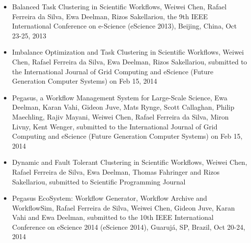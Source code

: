 \begin{itemize}
\item Balanced Task Clustering in Scientific Workflows, Weiwei Chen, Rafael Ferreira da Silva, Ewa Deelman, Rizos Sakellariou, the 9th IEEE International Conference on e-Science (eScience 2013), Beijing, China, Oct 23-25, 2013
\item Imbalance Optimization and Task Clustering in Scientific Workflows, Weiwei Chen, Rafael Ferreira da Silva, Ewa Deelman, Rizos Sakellariou, submitted to the International Journal of Grid Computing and eScience (Future Generation Computer Systems) on Feb 15, 2014
\item Pegasus, a Workflow Management System for Large-Scale Science, Ewa Deelman, Karan Vahi, Gideon Juve, Mats Rynge, Scott Callaghan, Philip Maechling, Rajiv Mayani, Weiwei Chen, Rafael Ferreira da Silva, Miron Livny, Kent Wenger, submitted to the International Journal of Grid Computing and eScience (Future Generation Computer Systems) on Feb 15, 2014
\item Dynamic and Fault Tolerant Clustering in Scientific Workflows, Weiwei Chen, Rafael Ferreira de Silva, Ewa Deelman, Thomas Fahringer and Rizos Sakellariou, submitted to Scientific Programming Journal 
\item Pegasus EcoSystem: Workflow Generator, Workflow Archive and WorkflowSim, Rafael Ferreira de Silva, Weiwei Chen, Gideon Juve, Karan Vahi and Ewa Deelman, submitted to the 10th IEEE International Conference on eScience 2014 (eScience 2014), Guarujá, SP, Brazil, Oct 20-24, 2014

\end{itemize}